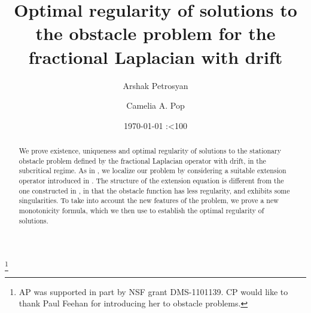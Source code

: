 \documentclass[11pt,reqno]{amsart}
\theoremstyle{definition}
\theoremstyle{remark}
\begin{document}
\title[Fractional Laplacian with drift]{Optimal regularity of solutions to the obstacle problem for the fractional Laplacian with drift}

\author[A. Petrosyan]{Arshak Petrosyan}
\address[AP]{Department of Mathematics, Purdue University, West Lafayette, IN 47907}

\author[C. Pop]{Camelia A. Pop}
\address[CP]{Department of Mathematics, University of Pennsylvania, Philadelphia, PA 19104-6395}

\date{\today{ }{\number\hh:\ifnum\mm<10{}0\fi\number\mm}}

\begin{abstract}
We prove existence, uniqueness and optimal regularity of solutions to the stationary obstacle problem defined by the fractional Laplacian operator with drift, in the subcritical regime. As in \cite{Caffarelli_Salsa_Silvestre_2008}, we localize our problem by considering a suitable extension operator introduced in \cite{Caffarelli_Silvestre_2007}. The structure of the extension equation is different from the one constructed in \cite{Caffarelli_Salsa_Silvestre_2008}, in that the obstacle function has less regularity, and exhibits some singularities. To take into account the new features of the problem, we prove a new monotonicity formula, which we then use to establish the optimal regularity of solutions.
\end{abstract}


\thanks{AP was supported in part by NSF grant DMS-1101139. CP would like to thank Paul Feehan for introducing her to obstacle problems.}

\maketitle

\tableofcontents
\end{document}
